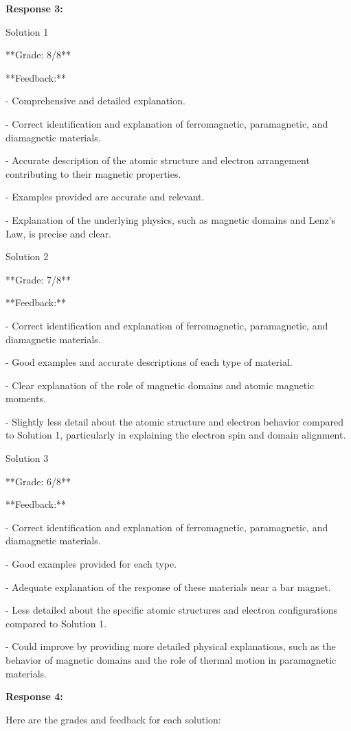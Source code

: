 \documentclass[a4paper,11pt]{article}
\begin{document}
\bigskip
\textbf{Response 3:}

Solution 1

**Grade: 8/8**

**Feedback:**

- Comprehensive and detailed explanation.

- Correct identification and explanation of ferromagnetic, paramagnetic, and diamagnetic materials.

- Accurate description of the atomic structure and electron arrangement contributing to their magnetic properties.

- Examples provided are accurate and relevant.

- Explanation of the underlying physics, such as magnetic domains and Lenz's Law, is precise and clear.

Solution 2

**Grade: 7/8**

**Feedback:**

- Correct identification and explanation of ferromagnetic, paramagnetic, and diamagnetic materials.

- Good examples and accurate descriptions of each type of material.

- Clear explanation of the role of magnetic domains and atomic magnetic moments.

- Slightly less detail about the atomic structure and electron behavior compared to Solution 1, particularly in explaining the electron spin and domain alignment.

Solution 3

**Grade: 6/8**

**Feedback:**

- Correct identification and explanation of ferromagnetic, paramagnetic, and diamagnetic materials.

- Good examples provided for each type.

- Adequate explanation of the response of these materials near a bar magnet.

- Less detailed about the specific atomic structures and electron configurations compared to Solution 1.

- Could improve by providing more detailed physical explanations, such as the behavior of magnetic domains and the role of thermal motion in paramagnetic materials.

\bigskip
\textbf{Response 4:}

Here are the grades and feedback for each solution:
\end{document}
